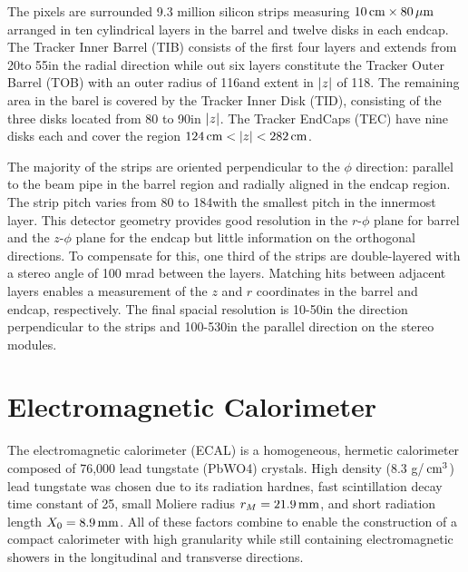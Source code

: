 The pixels are surrounded 9.3 million silicon strips measuring $10\,\text{cm}\times 80\,\mu\text{m}$ arranged in ten cylindrical layers in the barrel and twelve disks in each endcap.
The Tracker Inner Barrel (TIB) consists of the first four layers and extends from 20\cm to 55\cm in the radial direction while out six layers constitute the Tracker Outer Barrel (TOB) with an outer radius of 116\cm and extent in $\lvert z \rvert$ of 118\cm.
The remaining area in the barel is covered by the Tracker Inner Disk (TID), consisting of the three disks located from 80 to 90\cm in $\lvert z \rvert$.
The Tracker EndCaps (TEC) have nine disks each and cover the region $124\,\text{cm} < \lvert z \rvert < 282\,\text{cm}$.

The majority of the strips are oriented perpendicular to the $\phi$ direction: parallel to the beam pipe in the barrel region and radially aligned in the endcap region.
The strip pitch varies from 80 to 184\mum with the smallest pitch in the innermost layer.
This detector geometry provides good resolution in the $r$-$\phi$ plane for barrel and the $z$-$\phi$ plane for the endcap but little information on the orthogonal directions.
To compensate for this, one third of the strips are double-layered with a stereo angle of 100 mrad between the layers.
Matching hits between adjacent layers enables a measurement of the $z$ and $r$ coordinates in the barrel and endcap, respectively.
The final spacial resolution is 10-50\mum in the direction perpendicular to the strips and 100-530\mum in the parallel direction on the stereo modules.


\section{Electromagnetic Calorimeter}

The electromagnetic calorimeter (ECAL) is a homogeneous, hermetic calorimeter
composed of 76,000 lead tungstate (PbWO4) crystals.
High density (8.3 g/$\,\text{cm}^3$) lead tungstate was chosen due to its radiation hardnes, fast scintillation decay time constant of 25\ns, small Moliere radius $r_M= 21.9\,\text{mm}$, and short radiation length $X_0 = 8.9\,\text{mm}$.
All of these factors combine to enable the construction of a compact calorimeter with high granularity while still containing electromagnetic showers in the longitudinal and transverse directions.

